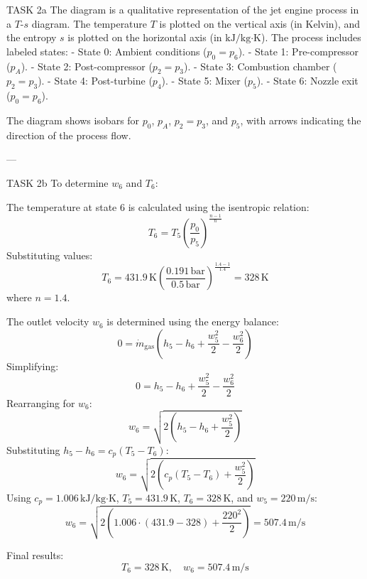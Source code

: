 TASK 2a  
The diagram is a qualitative representation of the jet engine process in a \( T \)-\( s \) diagram. The temperature \( T \) is plotted on the vertical axis (in Kelvin), and the entropy \( s \) is plotted on the horizontal axis (in \( \text{kJ}/\text{kg·K} \)). The process includes labeled states:  
- State 0: Ambient conditions (\( p_0 = p_6 \)).  
- State 1: Pre-compressor (\( p_A \)).  
- State 2: Post-compressor (\( p_2 = p_3 \)).  
- State 3: Combustion chamber (\( p_2 = p_3 \)).  
- State 4: Post-turbine (\( p_4 \)).  
- State 5: Mixer (\( p_5 \)).  
- State 6: Nozzle exit (\( p_0 = p_6 \)).  

The diagram shows isobars for \( p_0 \), \( p_A \), \( p_2 = p_3 \), and \( p_5 \), with arrows indicating the direction of the process flow.  

---

TASK 2b  
To determine \( w_6 \) and \( T_6 \):  

The temperature at state 6 is calculated using the isentropic relation:  
\[
T_6 = T_5 \left( \frac{p_0}{p_5} \right)^{\frac{n-1}{n}}
\]  
Substituting values:  
\[
T_6 = 431.9 \, \text{K} \left( \frac{0.191 \, \text{bar}}{0.5 \, \text{bar}} \right)^{\frac{1.4-1}{1.4}} = 328 \, \text{K}
\]  
where \( n = 1.4 \).  

The outlet velocity \( w_6 \) is determined using the energy balance:  
\[
0 = \dot{m}_{\text{gas}} \left( h_5 - h_6 + \frac{w_5^2}{2} - \frac{w_6^2}{2} \right)
\]  
Simplifying:  
\[
0 = h_5 - h_6 + \frac{w_5^2}{2} - \frac{w_6^2}{2}
\]  
Rearranging for \( w_6 \):  
\[
w_6 = \sqrt{2 \left( h_5 - h_6 + \frac{w_5^2}{2} \right)}
\]  
Substituting \( h_5 - h_6 = c_p (T_5 - T_6) \):  
\[
w_6 = \sqrt{2 \left( c_p (T_5 - T_6) + \frac{w_5^2}{2} \right)}
\]  
Using \( c_p = 1.006 \, \text{kJ/kg·K} \), \( T_5 = 431.9 \, \text{K} \), \( T_6 = 328 \, \text{K} \), and \( w_5 = 220 \, \text{m/s} \):  
\[
w_6 = \sqrt{2 \left( 1.006 \cdot (431.9 - 328) + \frac{220^2}{2} \right)} = 507.4 \, \text{m/s}
\]  

Final results:  
\[
T_6 = 328 \, \text{K}, \quad w_6 = 507.4 \, \text{m/s}
\]